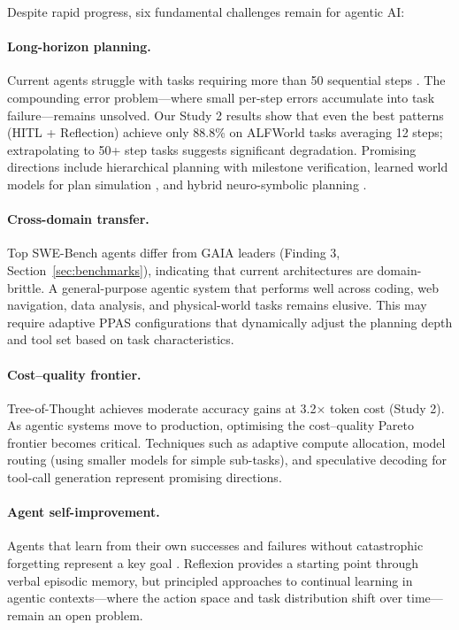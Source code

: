\documentclass[review]{elsarticle}
\theoremstyle{definition}
\begin{document}
Despite rapid progress, six fundamental challenges remain for agentic AI:

\paragraph{Long-horizon planning.} Current agents struggle with tasks requiring more than 50 sequential steps \citep{valmeekam2024planning,kinniment2024evaluating}. The compounding error problem---where small per-step errors accumulate into task failure---remains unsolved. Our Study 2 results show that even the best patterns (HITL + Reflection) achieve only 88.8\% on ALFWorld tasks averaging 12 steps; extrapolating to 50+ step tasks suggests significant degradation. Promising directions include hierarchical planning with milestone verification, learned world models for plan simulation \citep{hao2023reasoning}, and hybrid neuro-symbolic planning \citep{ghallab2004automated}.

\paragraph{Cross-domain transfer.} Top SWE-Bench agents differ from GAIA leaders (Finding 3, Section~\ref{sec:benchmarks}), indicating that current architectures are domain-brittle. A general-purpose agentic system that performs well across coding, web navigation, data analysis, and physical-world tasks remains elusive. This may require adaptive PPAS configurations that dynamically adjust the planning depth and tool set based on task characteristics.

\paragraph{Cost--quality frontier.} Tree-of-Thought achieves moderate accuracy gains at 3.2$\times$ token cost (Study 2). As agentic systems move to production, optimising the cost--quality Pareto frontier becomes critical. Techniques such as adaptive compute allocation, model routing (using smaller models for simple sub-tasks), and speculative decoding for tool-call generation represent promising directions.

\paragraph{Agent self-improvement.} Agents that learn from their own successes and failures without catastrophic forgetting represent a key goal \citep{christiano2017deep}. Reflexion \citep{shinn2023reflexion} provides a starting point through verbal episodic memory, but principled approaches to continual learning in agentic contexts---where the action space and task distribution shift over time---remain an open problem.
\end{document}
